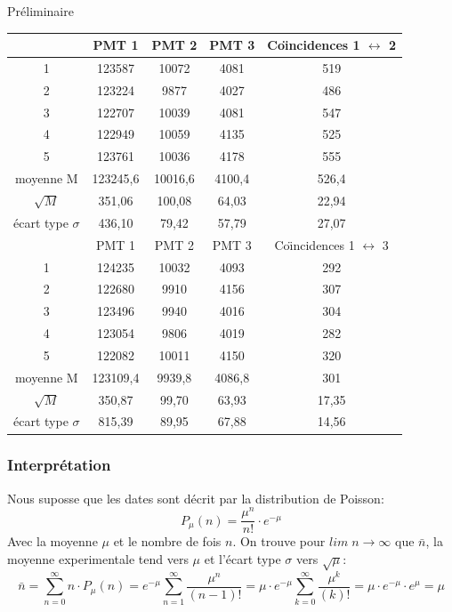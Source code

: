\documentclass[a4paper,11pt,liststotocnumbered,bibtotocnumbered]{scrartcl}
\begin{document}
\begin{section}{Préliminaire}
 \begin{tabular}{c|c|c|c|c}
   	&	PMT 1	&	PMT 2	&	PMT 3	&	Co\"{\i}ncidences 1 $\leftrightarrow$ 2	\\ \hline
1	&	123587	&	10072	&	4081	&	519	\\
2	&	123224	&	9877	&	4027	&	486	\\
3	&	122707	&	10039	&	4081	&	547	\\
4	&	122949	&	10059	&	4135	&	525	\\
5	&	123761	&	10036	&	4178	&	555	\\ \hline
moyenne M	&	123245,6	&	10016,6	&	4100,4	&	526,4	\\
$\sqrt M$	&	351,06	&	100,08	&	64,03	&	22,94	\\
écart type $\sigma$	&	436,10	&	79,42	&	57,79 &	27,07	\\ \hline
	&	PMT 1	&	PMT 2	&	PMT 3	&	Co\"{\i}ncidences 1 $\leftrightarrow$ 3	\\ \hline
1	&	124235	&	10032	&	4093	&	292	\\
2	&	122680	&	9910	&	4156	&	307	\\
3	&	123496	&	9940	&	4016	&	304	\\
4	&	123054	&	9806	&	4019	&	282	\\
5	&	122082	&	10011	&	4150	&	320	\\ \hline
moyenne M	&	123109,4	&	9939,8	&	4086,8	&	301	\\
$\sqrt M$	&	350,87	&	99,70	&	63,93	&	17,35	\\
écart type $\sigma$	&	815,39	&	89,95	&	67,88	&	14,56	\\
\end{tabular}

   \subsubsection{Interprétation} 
    Nous suposse que les dates sont décrit par la distribution de Poisson:
    \begin{equation*}
     P_{\mu}(n)=\frac{\mu^n}{n!}\cdot e^{-{\mu}}
    \end{equation*}
    Avec la moyenne $\mu$ et le nombre de fois $n$. On trouve pour $lim \; n {\rightarrow}  \infty$ que $\bar{n}$, la moyenne experimentale tend vers $\mu$ et l'écart type $\sigma$ vers $\sqrt{\mu}$:
    \begin{equation*}
     \bar{n}=\sum_{n=0}^{\infty} n \cdot P_{\mu}(n)=e^{-{\mu}}\sum_{n=1}^{\infty}\frac{\mu^n}{(n-1)!}=\mu \cdot  e^{-{\mu}}\sum_{k=0}^{\infty}\frac{\mu^k}{(k)!}=\mu \cdot e^{-{\mu}}\cdot  e^{{\mu}}=\mu
    \end{equation*}


\end{section}
\end{document}
